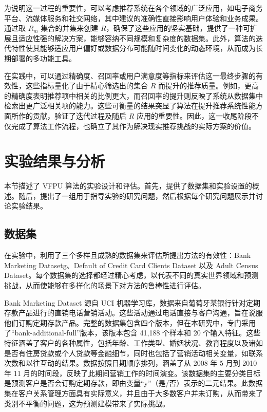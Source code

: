 为说明这一过程的重要性，可以考虑推荐系统在各个领域的广泛应用，如电子商务平台、流媒体服务和社交网络，其中建议的准确性直接影响用户体验和业务成果。通过取 ${{R}_{m}}$ 集合的并集来创建 $R$，确保了这些应用的坚实基础，提供了一种可扩展且适应性强的解决方案，能够容纳不同规模和复杂度的数据集。此外，算法的迭代特性使其能够适应用户偏好或数据分布可能随时间变化的动态环境，从而成为长期部署的多功能工具。

在实践中，可以通过精确度、召回率或用户满意度等指标来评估这一最终步骤的有效性，这些指标量化了由于精心筛选出的集合 $R$ 而提升的推荐质量。例如，更高的精确度表明推荐项中相关的比例更大，而召回率的提升则反映了系统从数据集中检索出更广泛相关项的能力。这些可衡量的结果突显了算法在提升推荐系统性能方面所作的贡献，验证了迭代过程及随后 $R$ 应用的重要性。因此，这一收尾阶段不仅完成了算法工作流程，也确立了其作为解决现实推荐挑战的实际方案的价值。  

\section{实验结果与分析}
本节描述了 VFPU 算法的实验设计和评估。首先，提供了数据集和实验设置的概述。随后，提出了一组用于指导实验的研究问题，然后根据每个研究问题展示并讨论实验结果。
\subsection{数据集}
在实验中，利用了三个多样且成熟的数据集来评估所提出方法的有效性：Bank Marketing Datasetg\citep{fitriani2021data}、Default of Credit Card Clients Dataset\citep{subasi2019prediction} 以及 Adult Census Dataset\citep{chakrabarty2018statistical}。每个数据集的选择都经过精心考虑，以代表不同的真实世界领域和预测挑战，从而使能够在多样化的场景下对方法的鲁棒性进行评估。

Bank Marketing Dataset 源自 UCI 机器学习库，数据来自葡萄牙某银行针对定期存款产品进行的直销电话营销活动。这些活动通过电话直接与客户沟通，旨在说服他们订购定期存款产品。完整的数据集包含四个版本，但在本研究中，专门采用了“bank-additional-full”版本，该版本包含 41,188 个样本和 20 个输入特征。这些特征涵盖了客户的各种属性，包括年龄、工作类型、婚姻状况、教育程度以及诸如是否有住房贷款或个人贷款等金融细节，同时也包括了营销活动相关变量，如联系次数和以往互动的结果。数据按照日期顺序排列，涵盖了从 2008 年 5 月到 2010 年 11 月的时间段，反映了此期间营销工作的时间演变。该数据集的主要分类目标是预测客户是否会订购定期存款，即由变量“y”（是/否）表示的二元结果。此数据集在客户关系管理方面具有实际意义，并且由于大多数客户并未订购，从而带来了类别不平衡的问题，这为预测建模带来了实际挑战。

